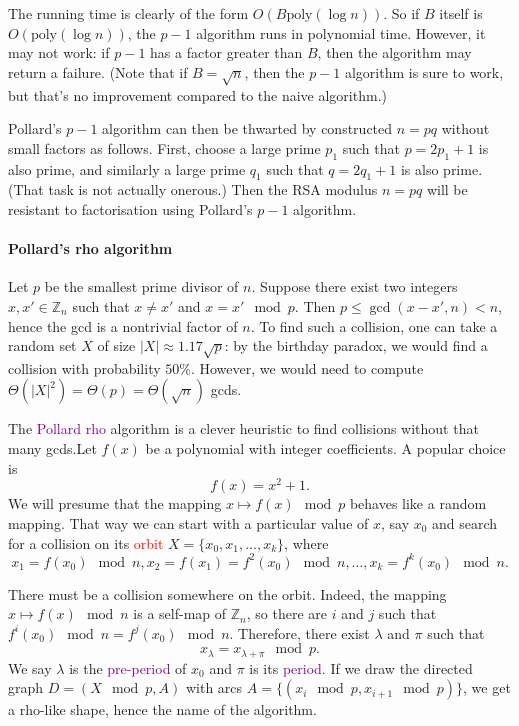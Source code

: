 \documentclass[a4paper, 11pt, openany]{book}
\numberwithin{equation}{section}
\theoremstyle{plain}
\theoremstyle{definition}
\newcommand{\Z}{\mathbb{Z}}
\newcommand{\Important}[1]{\textcolor{red}{#1}}
\newcommand{\Define}[1]{\textcolor{purple}{#1}}
\begin{document}
The running time is clearly of the form $O(B \text{poly}(\log n))$. So if $B$ itself is $O(\text{poly}(\log n))$, the $p-1$ algorithm runs in polynomial time. However, it may not work: if $p-1$ has a factor greater than $B$, then the algorithm may return a failure. (Note that if $B = \sqrt{n}$, then the $p-1$ algorithm is sure to work, but that's no improvement compared to the naive algorithm.)

Pollard's $p-1$ algorithm can then be thwarted by constructed $n = pq$ without small factors as follows. First, choose a large prime $p_1$ such that $p = 2p_1 + 1$ is also prime, and similarly a large prime $q_1$ such that $q = 2q_1 + 1$ is also prime. (That task is not actually onerous.) Then the RSA modulus $n = pq$ will be resistant to factorisation using Pollard's $p-1$ algorithm.


\paragraph{Pollard's rho algorithm}

Let $p$ be the smallest prime divisor of $n$. Suppose there exist two integers $x, x' \in \Z_n$ such that $x \ne x'$ and $x = x' \mod p$. Then $p \le \gcd(x-x',n) < n$, hence the gcd is a nontrivial factor of $n$. To find such a collision, one can take a random set $X$ of size $|X| \approx 1.17 \sqrt{p}$: by the birthday paradox, we would find a collision with probability $50\%$. However, we would need to compute $\Theta(|X|^2) = \Theta(p) = \Theta(\sqrt{n})$ gcds.

The \Define{Pollard rho} algorithm is a clever heuristic to find collisions without that many gcds.Let $f(x)$ be a polynomial with integer coefficients. A popular choice is 
\[
    f(x) = x^2 + 1.
\]
We will presume that the mapping $x \mapsto f(x) \mod p$ behaves like a random mapping. That way we can start with a particular value of $x$, say $x_0$ and search for a collision on its \Important{orbit} $X = \{x_0, x_1, \dots, x_k\}$, where
\[
    x_1 = f(x_0) \mod n, x_2 = f(x_1) = f^2(x_0) \mod n, \dots, x_k = f^k(x_0) \mod n.
\]

There must be a collision somewhere on the orbit. Indeed, the mapping $x \mapsto f(x) \mod n$ is a self-map of $\Z_n$, so there are $i$ and $j$ such that $f^i(x_0) \mod n = f^j(x_0) \mod n$. Therefore, there exist $\lambda$ and $\pi$ such that 
\[
    x_\lambda = x_{\lambda + \pi} \mod p.
\]
We say $\lambda$ is the \Define{pre-period} of $x_0$ and $\pi$ is its \Define{period}. If we draw the directed graph $D = (X \mod p, A)$ with arcs $A = \{ (x_i \mod p, x_{i+1} \mod p) \}$, we get a rho-like shape, hence the name of the algorithm.
\end{document}
